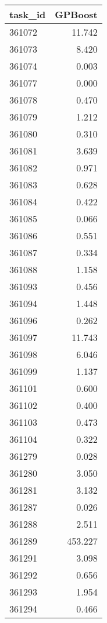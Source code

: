 \begin{tabular}{lr}
\toprule
task\_id & GPBoost \\
\midrule
361072 & 11.742 \\
361073 & 8.420 \\
361074 & 0.003 \\
361077 & 0.000 \\
361078 & 0.470 \\
361079 & 1.212 \\
361080 & 0.310 \\
361081 & 3.639 \\
361082 & 0.971 \\
361083 & 0.628 \\
361084 & 0.422 \\
361085 & 0.066 \\
361086 & 0.551 \\
361087 & 0.334 \\
361088 & 1.158 \\
361093 & 0.456 \\
361094 & 1.448 \\
361096 & 0.262 \\
361097 & 11.743 \\
361098 & 6.046 \\
361099 & 1.137 \\
361101 & 0.600 \\
361102 & 0.400 \\
361103 & 0.473 \\
361104 & 0.322 \\
361279 & 0.028 \\
361280 & 3.050 \\
361281 & 3.132 \\
361287 & 0.026 \\
361288 & 2.511 \\
361289 & 453.227 \\
361291 & 3.098 \\
361292 & 0.656 \\
361293 & 1.954 \\
361294 & 0.466 \\
\bottomrule
\end{tabular}
